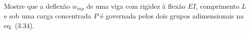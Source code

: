 Mostre que a deflexão $w_{mp}$ de uma viga com rigidez à flexão $EI$, comprimento $L$ e sob uma carga concentrada $P$ é governada pelos dois grupos adimensionais na eq. (3.34).


